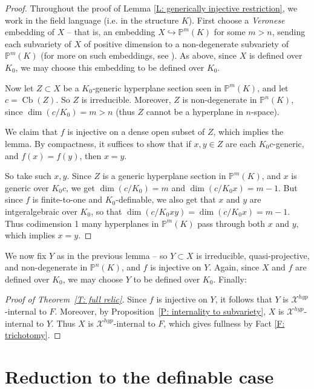 \documentclass{amsart}
\theoremstyle{definition}
\begin{document}
\begin{proof}
Throughout the proof of Lemma \ref{L: generically injective restriction}, we work in the field language (i.e. in the structure $K$). First choose a \textit{Veronese} embedding of $X$ -- that is, an embedding $X\hookrightarrow\mathbb P^m(K)$ for some $m>n$, sending each subvariety of $X$ of positive dimension to a non-degenerate subvariety of $\mathbb P^m(K)$ (for more on such embeddings, see \cite[Lecture 2]{HarrisAG}). As above, since $X$ is defined over $K_0$, we may choose this embedding to be defined over $K_0$.

Now let $Z\subset X$ be a $K_0$-generic hyperplane section seen in $\mathbb P^m(K)$, and let $c=\operatorname{Cb}(Z)$. So $Z$ is irreducible. Moreover, $Z$ is non-degenerate in $\mathbb P^n(K)$, since $\dim(c/K_0)=m>n$ (thus $Z$ cannot be a hyperplane in $n$-space). 

We claim that $f$ is injective on a dense open subset of $Z$, which implies the lemma. By compactness, it suffices to show that if $x,y \in Z$ are each $K_0c$-generic, and $f(x)=f(y)$, then $x=y$.

So take such $x,y$. Since $Z$ is a generic hyperplane section in $\mathbb P^m(K)$, and $x$ is generic over $K_0c$, we get $\dim(c/K_0)=m$ and $\dim(c/K_0x)=m-1$. But since $f$ is finite-to-one and $K_0$-definable, we also get that $x$ and $y$ are intgeralgebraic over $K_0$, so that $\dim(c/K_0xy)=\dim(c/K_0x)=m-1$. Thus codimension 1 many hyperplanes in $\mathbb P^m(K)$ pass through both $x$ and $y$, which implies $x=y$.
\end{proof}

We now fix $Y$ as in the previous lemma -- so $Y\subset X$ is irreducible, quasi-projective, and non-degenerate in $\mathbb P^n(K)$, and $f$ is injective on $Y$. Again, since $X$ and $f$ are defined over $K_0$, we may choose $Y$ to be defined over $K_0$. Finally: 

\begin{proof}[Proof of Theorem~\ref{T: full relic}]

Since $f$ is injective on $Y$, it follows that $Y$ is $\mathcal X^{hyp}$-internal to $F$. Moreover, by Proposition~\ref{P: internality to subvariety}, $X$ is $\mathcal X^{hyp}$-internal to $Y$. Thus $X$ is $\mathcal X^{hyp}$-internal to $F$, which gives fullness by Fact \ref{F: trichotomy}. 
\end{proof}

\section{Reduction to the definable case}
\end{document}
